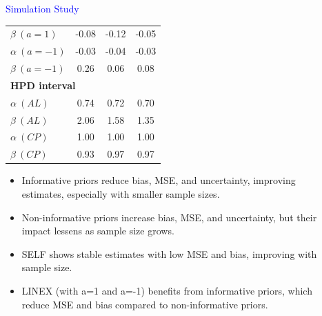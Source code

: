 \documentclass[final]{beamer}
\newlength{\sepwidth}
\newlength{\colwidth}
\newcommand{\separatorcolumn}{\begin{column}{\sepwidth}\end{column}}
\begin{document}
\begin{frame}[t]
\begin{columns}[t]
\begin{column}{\colwidth}
\begin{block}{\textcolor{blue}{Simulation Study}}
{\begin{table}[h!]
\begin{tabular}{lccc}
        $\beta \ (a=1)$        & -0.08         & -0.12         & -0.05         \\
        $\alpha \ (a=-1)$      & -0.03         & -0.04         & -0.03         \\
        $\beta \ (a=-1)$       & 0.26          & 0.06          & 0.08          \\
        \midrule
        \multicolumn{4}{l}{\textbf{HPD interval}} \\
        $\alpha \ (AL)$        & 0.74          & 0.72          & 0.70          \\
        $\beta \ (AL)$         & 2.06          & 1.58          & 1.35          \\
        $\alpha \ (CP)$        & 1.00          & 1.00          & 1.00          \\
        $\beta \ (CP)$         & 0.93          & 0.97          & 0.97          \\
        \bottomrule
    \end{tabular}
\end{table}}

\begin{itemize}
  \item Informative priors reduce bias, MSE, and uncertainty, improving estimates, especially with smaller sample sizes.
  \vspace{0.5mm}
  \item Non-informative priors increase bias, MSE, and uncertainty, but their impact lessens as sample size grows.
  \vspace{0.5mm}
  \item SELF shows stable estimates with low MSE and bias, improving with sample size.
  \vspace{0.5mm}
  \item LINEX (with a=1 and a=-1) benefits from informative priors, which reduce MSE and bias compared to non-informative priors.
\end{itemize}
 \end{block} 
\end{column}
\separatorcolumn


\end{columns}
\end{frame}
\end{document}
